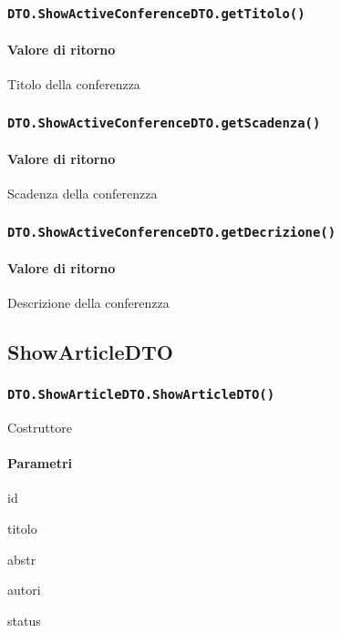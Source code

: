 \subsubsection{\texttt{DTO.ShowActiveConferenceDTO.getTitolo()}}
\paragraph{Valore di ritorno}
\begin{description}
\item Titolo della conferenzza
\end{description}
\subsubsection{\texttt{DTO.ShowActiveConferenceDTO.getScadenza()}}
\paragraph{Valore di ritorno}
\begin{description}
\item Scadenza  della conferenzza
\end{description}
\subsubsection{\texttt{DTO.ShowActiveConferenceDTO.getDecrizione()}}
\paragraph{Valore di ritorno}
\begin{description}
\item Descrizione della conferenzza
\end{description}

\subsection{ShowArticleDTO}
\subsubsection{\texttt{DTO.ShowArticleDTO.ShowArticleDTO()}}
Costruttore
\paragraph{Parametri}
\begin{description}
\item id
\item titolo
\item abstr
\item autori
\item status
\end{description}
